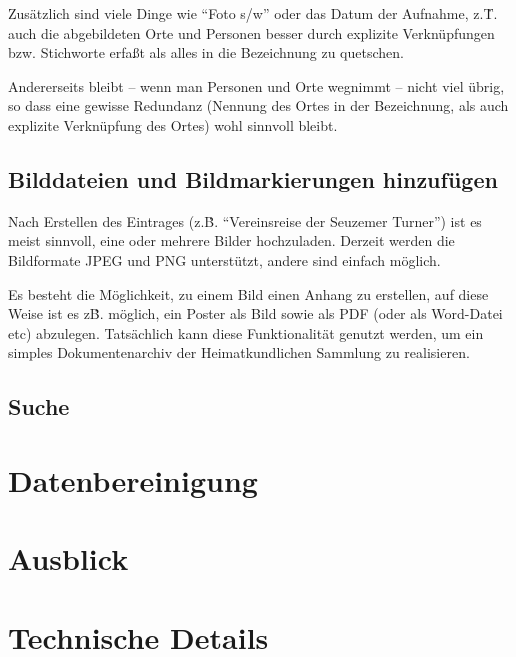 \documentclass{scrartcl}
\begin{document}
Zusätzlich sind viele Dinge wie ``Foto s/w'' oder das Datum der Aufnahme,
z.\.T. auch die abgebildeten Orte und Personen besser durch explizite
Verknüpfungen bzw. Stichworte erfaßt als alles in die Bezeichnung zu quetschen.

Andererseits bleibt -- wenn man Personen und Orte wegnimmt -- nicht viel übrig,
so dass eine gewisse Redundanz (Nennung des Ortes in der Bezeichnung, als auch
explizite Verknüpfung des Ortes) wohl sinnvoll bleibt.


\subsection{Bilddateien und Bildmarkierungen hinzufügen}

Nach Erstellen des Eintrages (z.\.B. ``Vereinsreise der Seuzemer Turner'')
ist es meist sinnvoll, eine oder mehrere Bilder hochzuladen. Derzeit werden die Bildformate
JPEG und PNG unterstützt, andere sind einfach möglich.

Es besteht die Möglichkeit, zu einem Bild einen Anhang zu erstellen, auf diese Weise
ist es z\.B. möglich, ein Poster als Bild sowie als PDF (oder als Word-Datei etc)
abzulegen. Tatsächlich kann diese Funktionalität genutzt werden, um ein simples Dokumentenarchiv
der Heimatkundlichen Sammlung zu realisieren.




\subsection{Suche}

\section{Datenbereinigung}

\section{Ausblick}

\appendix

\section{Technische Details}
\end{document}
